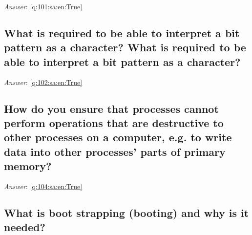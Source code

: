 \documentclass[a4paper,11pt,oneside]{article}
\begin{document}
\begin{sloppypar}
\label{q:101:sa:en:False}

\vspace{2cm}

\noindent\makebox[\textwidth]{\hrulefill}

\vspace{1cm}

\textit{Answer}: \autoref{q:101:sa:en:True}



\subsection{What is required to be able to interpret a bit pattern as a character? What is required to be able to interpret a bit pattern as a character?}

\label{q:102:sa:en:False}

\vspace{2cm}

\noindent\makebox[\textwidth]{\hrulefill}

\vspace{1cm}

\textit{Answer}: \autoref{q:102:sa:en:True}



\subsection{How do you ensure that processes cannot perform operations that are destructive to other processes on a computer, e.g. to write data into other processes' parts of primary memory?}

\label{q:104:sa:en:False}

\vspace{2cm}

\noindent\makebox[\textwidth]{\hrulefill}

\vspace{1cm}

\textit{Answer}: \autoref{q:104:sa:en:True}



\subsection{What is boot strapping (booting) and why is it needed?}

\label{q:105:sa:en:False}

\vspace{2cm}

\noindent\makebox[\textwidth]{\hrulefill}


\end{sloppypar}
\end{document}
